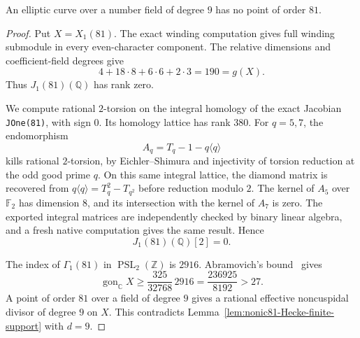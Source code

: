 
\begin{proposition}\label{prop:nonic-no81}
An elliptic curve over a number field of degree $9$ has no point of
order $81$.
\end{proposition}
\begin{proof}
Put $X=X_1(81)$. The exact winding computation gives full winding
submodule in every even-character component. The relative dimensions
and coefficient-field degrees give
\[
 4+18\cdot8+6\cdot6+2\cdot3=190=g(X).
\]
Thus $J_1(81)(\mathbb Q)$ has rank zero.

We compute rational $2$-torsion on the integral homology of the exact
Jacobian \texttt{JOne(81)}, with sign $0$. Its homology lattice has
rank $380$. For $q=5,7$, the endomorphism
\[
 A_q=T_q-1-q\langle q\rangle
\]
kills rational $2$-torsion, by Eichler--Shimura and injectivity of
torsion reduction at the odd good prime $q$.
On this same integral lattice, the diamond matrix is recovered from
$q\langle q\rangle=T_q^2-T_{q^2}$ before reduction modulo $2$.
The kernel of $A_5$ over $\mathbb F_2$ has dimension $8$, and its
intersection with the kernel of $A_7$ is zero. The exported integral
matrices are independently checked by binary linear algebra, and
a fresh native computation gives the same result. Hence
\[
 J_1(81)(\mathbb Q)[2]=0.
\]

The index of $\Gamma_1(81)$ in $\operatorname{PSL}_2(\mathbb Z)$
is $2916$. Abramovich's bound~\cite{Abramovich} gives
\[
 \operatorname{gon}_{\mathbb C}X
 \geq \frac{325}{32768}\,2916
 =\frac{236925}{8192}>27.
\]
A point of order $81$ over a field of degree $9$ gives a rational
effective noncuspidal divisor of degree $9$ on $X$. This contradicts
Lemma~\ref{lem:nonic81-Hecke-finite-support} with $d=9$.
\end{proof}

